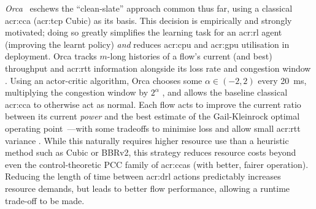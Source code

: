 \emph{Orca}~\parencite{DBLP:conf/sigcomm/AbbaslooYC20} eschews the ``clean-slate'' approach common thus far, using a classical \gls{acr:cca} (\gls{acr:tcp} Cubic) as its basis.
This decision is empirically and strongly motivated; doing so greatly simplifies the learning task for an \gls{acr:rl} agent (improving the learnt policy) \emph{and} reduces \gls{acr:cpu} and \gls{acr:gpu} utilisation in deployment.
Orca tracks $m$-long histories of a flow's current (and best) throughput and \gls{acr:rtt} information alongside its loss rate and congestion window \prllitstate.
Using an actor-critic algorithm, Orca chooses some $\alpha\in\left(-2, 2\right)$ every \qty{20}{\milli\second}, multiplying the congestion window by $2^\alpha$ \prllitactreal, and allows the baseline classical \gls{acr:cca} to otherwise act as normal.
Each flow acts to improve the current ratio between its current \emph{power} and the best estimate of the Gail-Kleinrock optimal operating point~\parencite{KleinrockPoint1,KleinrockPoint2}---with some tradeoffs to minimise loss and allow small \gls{acr:rtt} variance \prllitreward.
While this naturally requires higher resource use than a heuristic method such as Cubic or BBRv2, this strategy reduces resource costs beyond even the control-theoretic PCC family of \glspl{acr:cca} (with better, fairer operation).
Reducing the length of time between \gls{acr:drl} actions predictably increases resource demands, but leads to better flow performance, allowing a runtime trade-off to be made.

